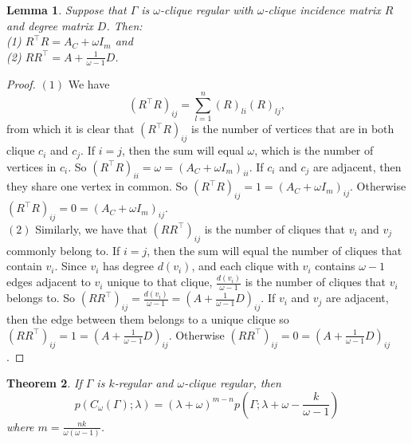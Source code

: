 \documentclass[12pt]{report}
\newtheorem{thm}{Theorem}[chapter]
\newtheorem{lem}[thm]{Lemma}
\theoremstyle{definition}
\begin{document}
\begin{lem} \label{lem:blockmat}
Suppose that $\Gamma$ is $\omega$-clique regular with $\omega$-clique incidence matrix $R$ and degree matrix $D$. Then:\vspace{0.2cm} \\
           \hspace*{0.5cm} (1) $R^\top R=A_C + \omega I_m$ and  \\
           \hspace*{0.5cm} (2) $RR^\top  = A + \frac{1}{\omega -1}D$. \vspace{0.2cm}
\end{lem}
\begin{proof}
    $(1)$ We have
    \[(R^\top R)_{ij} = \sum_{l=1}^n (R)_{li}(R)_{lj},\] 
    from which it is clear that $(R^\top R)_{ij}$ is the number of vertices that are in both clique $c_i$ and $c_j$. If $i=j$, then the sum will equal $\omega$, which is the number of vertices in $c_i$. So $(R^\top R)_{ii} = \omega =(A_C + \omega I_m)_{ii}$. If $c_i$ and $c_j$ are adjacent, then they share one vertex in common. So $(R^\top R)_{ij} = 1 = (A_C + \omega I_m)_{ij}$. Otherwise $(R^\top R)_{ij}=0=(A_C + \omega I_m)_{ij}$.\\
    $(2)$ Similarly, we have that $(RR^\top )_{ij}$ is the number of cliques that $v_i$ and $v_j$ commonly belong to. If $i=j$, then the sum will equal the number of cliques that contain $v_i$. Since $v_i$ has degree $d(v_i)$, and each clique with $v_i$ contains $\omega -1$ edges adjacent to $v_i$ unique to that clique, $\frac{d(v_i)}{\omega -1}$ is the number of cliques that $v_i$ belongs to. So $(RR^\top )_{ij} = \frac{d(v_i)}{\omega -1} = (A + \frac{1}{\omega -1}D)_{ij}$. If $v_i$ and $v_j$ are adjacent, then the edge between them belongs to a unique clique so $(RR^\top )_{ij} = 1 = (A + \frac{1}{\omega -1}D)_{ij}$. Otherwise $(RR^\top )_{ij} = 0 =(A + \frac{1}{\omega -1}D)_{ij}$.
\end{proof}
\begin{thm} \label{thm:eigen}
    If $\Gamma$ is $k$-regular and $\omega$-clique regular, then 
    \[p(C_\omega(\Gamma); \lambda)=(\lambda+\omega)^{m-n}p\left(\Gamma;\lambda+\omega-\frac{k}{\omega - 1}\right)\]
    where $m=\frac{nk}{\omega(\omega-1)}$.
\end{thm}
\end{document}
